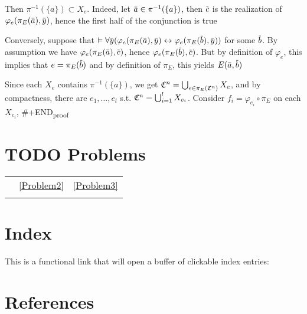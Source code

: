 \documentclass[11pt]{article}
\begin{document}
Then \(\pi^{-1}(\{a\})\subset X_e\). Indeed, let \(\bara\in\pi^{-1}(\{a\})\), then \(\barc\) is the realization
of \(\varphi_e(\pi_E(\bara),\bary)\), hence the first half of the conjunction is true

Conversely, suppose that \(\vDash\forall\bary(\varphi_e(\pi_E(\bara),\bary)\leftrightarrow\varphi_e(\pi_E(\barb),\bary))\) for
some \(\barb\). By assumption we have \(\varphi_e(\pi_E(\bara),\barc)\), hence \(\varphi_e(\pi_E(\barb),\barc)\).
But by definition of \(\varphi_e\), this implies that \(e=\pi_E(\barb)\) and by definition of \(\pi_E\),
this yields \(E(\bara,\barb)\)

Since each \(X_e\) contains \(\pi^{-1}(\{a\})\), we get \(\mathfrak{C}^n=\bigcup_{e\in\pi_E(\mathfrak{C}^n)}X_e\), and by compactness,
there are \(e_1,\dots,e_l\) s.t. \(\mathfrak{C}^n=\bigcup_{i=1}^lX_{e_i}\). Consider \(f_i=\varphi_{e_i}\circ\pi_E\) on
each \(X_{e_i}\),
\#+END\textsubscript{proof}


\section{{\bfseries\sffamily TODO} Problems}
\label{sec:org0e3b8e7}
\begin{center}
\begin{tabular}{lll}
 & \ref{Problem2} & \ref{Problem3}\\
 &  & \\
\end{tabular}
\end{center}

\section{Index}
\label{sec:org5acf065}

This is a functional link that will open a buffer of clickable index entries:

\renewcommand{\indexname}{}
\printindex

\section{References}
\label{sec:org1bc700d}

\label{bibliographystyle link}


\label{bibliography link}

\end{document}
